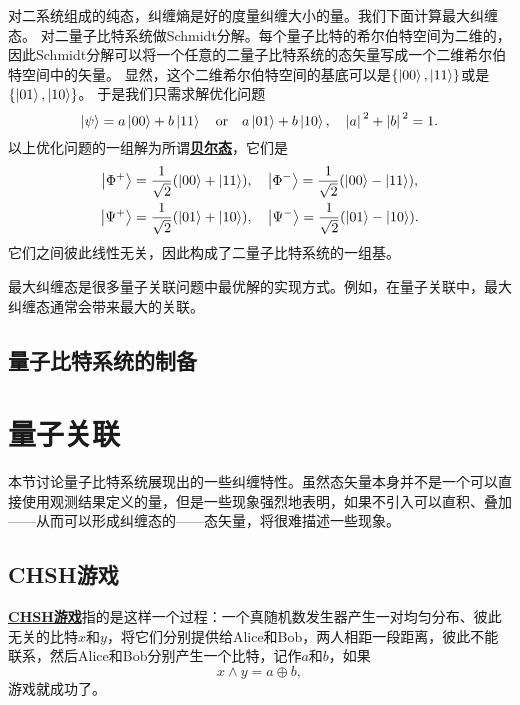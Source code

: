 \documentclass[hyperref, UTF8, a4paper]{ctexart}
\newcommand*{\concept}[1]{\underline{\textbf{#1}}}
\begin{document}
对二系统组成的纯态，纠缠熵是好的度量纠缠大小的量。我们下面计算最大纠缠态。
对二量子比特系统做Schmidt分解。每个量子比特的希尔伯特空间为二维的，因此Schmidt分解可以将一个任意的二量子比特系统的态矢量写成一个二维希尔伯特空间中的矢量。
显然，这个二维希尔伯特空间的基底可以是$\{\ket{00}, \ket{11}\}$或是$\{\ket{01}, \ket{10}\}$。
于是我们只需求解优化问题
\[
    \ket{\psi} = a \ket{00} + b \ket{11} \quad \text{or} \quad a \ket{01} + b \ket{10}, \quad \abs*{a}^2 + \abs*{b}^2 = 1.
\]
以上优化问题的一组解为所谓\concept{贝尔态}，它们是
\begin{equation}
    \begin{aligned}
        \ket{\Phi^+} &= \frac{1}{\sqrt{2}} (\ket{00} + \ket{11}), \quad \ket{\Phi^-} = \frac{1}{\sqrt{2}} (\ket{00} - \ket{11}), \\
        \ket{\Psi^+} &= \frac{1}{\sqrt{2}} (\ket{01} + \ket{10}), \quad \ket{\Psi^-} = \frac{1}{\sqrt{2}} (\ket{01} - \ket{10}).
    \end{aligned}
\end{equation}
它们之间彼此线性无关，因此构成了二量子比特系统的一组基。

最大纠缠态是很多量子关联问题中最优解的实现方式。例如，在量子关联中，最大纠缠态通常会带来最大的关联。

\subsection{量子比特系统的制备}

\section{量子关联}\label{sec:correlation}

本节讨论量子比特系统展现出的一些纠缠特性。虽然态矢量本身并不是一个可以直接使用观测结果定义的量，但是一些现象强烈地表明，如果不引入可以直积、叠加——从而可以形成纠缠态的——态矢量，将很难描述一些现象。

\subsection{CHSH游戏}

\concept{CHSH游戏}指的是这样一个过程：一个真随机数发生器产生一对均匀分布、彼此无关的比特$x$和$y$，将它们分别提供给Alice和Bob，两人相距一段距离，彼此不能联系，然后Alice和Bob分别产生一个比特，记作$a$和$b$，如果
\begin{equation}
    x \land y = a \oplus b,
\end{equation}
游戏就成功了。
\end{document}
